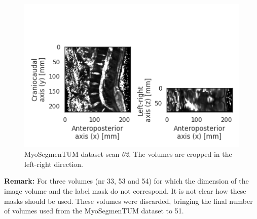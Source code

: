 \begin{figure}
    \centering
    \includegraphics[width=.95\textwidth]{automated_graphs/OSF_02.png}
    \caption{MyoSegmenTUM dataset scan \textit{02}. 
    The volumes are cropped in the left-right direction. 
    \label{fig:OSF_02}}
\end{figure}

\textbf{Remark:} For three volumes (nr 33, 53 and 54) for which the dimension of the image volume and the label mask do not correspond. 
It is not clear how these masks should be used. 
These volumes were discarded, bringing the final number of volumes used from the MyoSegmenTUM dataset to 51.